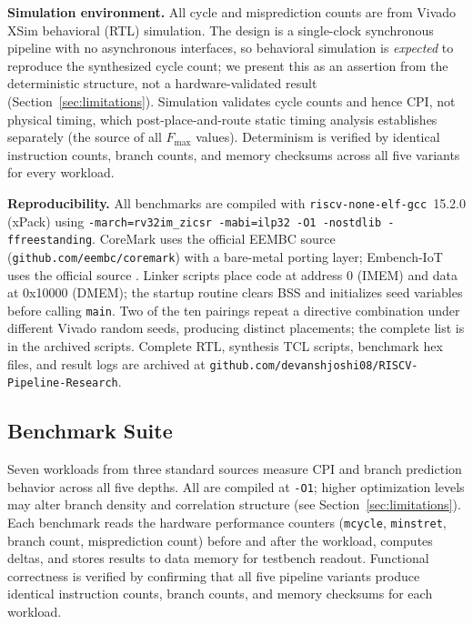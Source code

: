 \documentclass[acmsmall,nonacm,screen]{acmart}
\begin{document}
\textbf{Simulation environment.}
All cycle and misprediction counts are from Vivado XSim behavioral (RTL) simulation.
The design is a single-clock synchronous pipeline with no asynchronous interfaces, so behavioral simulation is \emph{expected} to reproduce the synthesized cycle count; we present this as an assertion from the deterministic structure, not a hardware-validated result (Section~\ref{sec:limitations}).
Simulation validates cycle counts and hence CPI, not physical timing, which post-place-and-route static timing analysis establishes separately (the source of all $F_{\max}$ values).
Determinism is verified by identical instruction counts, branch counts, and memory checksums across all five variants for every workload.

\textbf{Reproducibility.}
All benchmarks are compiled with \texttt{riscv-none-elf-gcc}~15.2.0 (xPack) using \texttt{-march=rv32im\_zicsr -mabi=ilp32 -O1 -nostdlib -ffreestanding}.
CoreMark uses the official EEMBC source (\texttt{github.com/eembc/coremark}) with a bare-metal porting layer; Embench-IoT uses the official source \cite{embench2019}.
Linker scripts place code at address 0 (IMEM) and data at 0x10000 (DMEM); the startup routine clears BSS and initializes seed variables before calling \texttt{main}.
Two of the ten pairings repeat a directive combination under different Vivado random seeds, producing distinct placements; the complete list is in the archived scripts.
Complete RTL, synthesis TCL scripts, benchmark hex files, and result logs are archived at \texttt{github.com/devanshjoshi08/RISCV-Pipeline-Research}.

\subsection{Benchmark Suite}
\label{sec:benchmarks}

Seven workloads from three standard sources measure CPI and branch prediction behavior across all five depths.
All are compiled at \texttt{-O1}; higher optimization levels may alter branch density and correlation structure (see Section~\ref{sec:limitations}).
Each benchmark reads the hardware performance counters (\texttt{mcycle}, \texttt{minstret}, branch count, misprediction count) before and after the workload, computes deltas, and stores results to data memory for testbench readout.
Functional correctness is verified by confirming that all five pipeline variants produce identical instruction counts, branch counts, and memory checksums for each workload.
\end{document}
